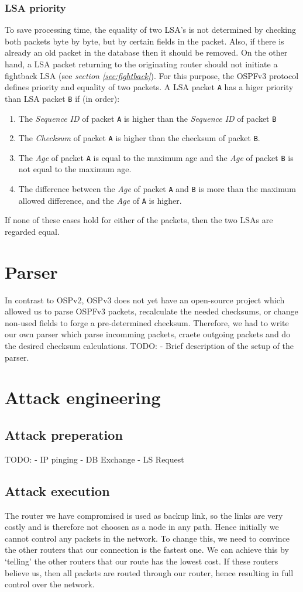 \documentclass[11pt,a4paper,oneside]{article}
\newcommand{\lsection}[2]{\section{#1}\label{sec:#2}}
\newcommand{\lsubsection}[2]{\subsection{#1}\label{sec:#2}}
\newcommand{\lsubsubsection}[2]{\subsubsection{#1}\label{sec:#2}}
\begin{document}
			\lsubsubsection{LSA priority}{lsa_priority}
				To save processing time, the equality of two LSA's is not determined by checking both packets byte by byte, but by certain fields in the packet. Also, if there is already an old packet in the database then it should be removed. On the other hand, a LSA packet returning to the originating router should not initiate a fightback LSA (see \textit{section \ref{sec:fightback}}). For this purpose, the OSPFv3 protocol defines priority and equality of two packets.
				A LSA packet \texttt{A} has a higer priority than LSA packet \texttt{B} if (in order):
				\begin{enumerate}
					\item The \textit{Sequence ID} of packet \texttt{A} is higher than the \textit{Sequence ID} of packet \texttt{B}
					\item The \textit{Checksum} of packet \texttt{A} is higher than the checksum of packet \texttt{B}.
					\item The \textit{Age} of packet \texttt{A} is equal to the maximum age and the \textit{Age} of packet \texttt{B} is not equal to the maximum age.
					\item The difference between the \textit{Age} of packet \texttt{A} and \texttt{B} is more than the maximum allowed difference, and the \textit{Age} of \texttt{A} is higher.
				\end{enumerate}
				If none of these cases hold for either of the packets, then the two LSAs are regarded equal.
	\lsection{Parser}{parser}
   		In contrast to OSPv2, OSPv3 does not yet have an open-source project which allowed us to parse OSPFv3 packets, recalculate the needed checksums, or change non-used fields to forge a pre-determined checksum. Therefore, we had to write our own parser which parse incomming packets, craete outgoing packets and do the desired checksum calculations.
    		TODO:
    		- Brief description of the setup of the parser.
   		
   	\lsection{Attack engineering}{attack}
   		\lsubsection{Attack preperation}{attack_prep}
   			TODO:
			- IP pinging
	    		- DB Exchange
	    		- LS Request
    			
    			
    		\lsubsection{Attack execution}{attack_exec}
    			The router we have compromised is used as backup link, so the links are very costly and is therefore not choosen as a node in any path. Hence initially we cannot control any packets in the network. To change this, we need to convince the other routers that our connection is the fastest one. We can achieve this by `telling' the other routers that our route has the lowest cost. If these routers believe us, then all packets are routed through our router, hence resulting in full control over the network.
    			
\end{document}
